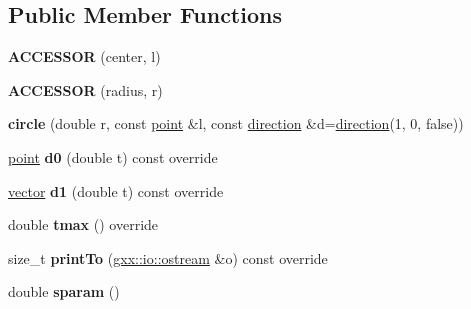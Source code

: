 \subsection*{Public Member Functions}
\begin{DoxyCompactItemize}
\item 
{\bfseries A\+C\+C\+E\+S\+S\+OR} (center, l)\hypertarget{classgxx_1_1geom2_1_1circle_a3fbb943fcea9df55e691b65dc692180a}{}\label{classgxx_1_1geom2_1_1circle_a3fbb943fcea9df55e691b65dc692180a}

\item 
{\bfseries A\+C\+C\+E\+S\+S\+OR} (radius, r)\hypertarget{classgxx_1_1geom2_1_1circle_abf1e43383d40e0531098a1a9c60620e7}{}\label{classgxx_1_1geom2_1_1circle_abf1e43383d40e0531098a1a9c60620e7}

\item 
{\bfseries circle} (double r, const \hyperlink{classmalgo_1_1vector2}{point} \&l, const \hyperlink{classmalgo_1_1unit__vector2}{direction} \&d=\hyperlink{classmalgo_1_1unit__vector2}{direction}(1, 0, false))\hypertarget{classgxx_1_1geom2_1_1circle_a8ecb3cd0d6a38d9554b9e3bae2ac3392}{}\label{classgxx_1_1geom2_1_1circle_a8ecb3cd0d6a38d9554b9e3bae2ac3392}

\item 
\hyperlink{classmalgo_1_1vector2}{point} {\bfseries d0} (double t) const override\hypertarget{classgxx_1_1geom2_1_1circle_af079d357aa91bb278f3fabf190caa665}{}\label{classgxx_1_1geom2_1_1circle_af079d357aa91bb278f3fabf190caa665}

\item 
\hyperlink{classmalgo_1_1vector2}{vector} {\bfseries d1} (double t) const override\hypertarget{classgxx_1_1geom2_1_1circle_ab4789d64c29578ce2e70a241fabfeee3}{}\label{classgxx_1_1geom2_1_1circle_ab4789d64c29578ce2e70a241fabfeee3}

\item 
double {\bfseries tmax} () override\hypertarget{classgxx_1_1geom2_1_1circle_a97cac06440f256ec67c680fbc973e9e6}{}\label{classgxx_1_1geom2_1_1circle_a97cac06440f256ec67c680fbc973e9e6}

\item 
size\+\_\+t {\bfseries print\+To} (\hyperlink{classgxx_1_1io_1_1ostream}{gxx\+::io\+::ostream} \&o) const override\hypertarget{classgxx_1_1geom2_1_1circle_ab1883e9a35d83218c36b32413c6fb4ac}{}\label{classgxx_1_1geom2_1_1circle_ab1883e9a35d83218c36b32413c6fb4ac}

\item 
double {\bfseries sparam} ()\hypertarget{classgxx_1_1geom2_1_1circle_a26e16cd9190f29df3dcfbbce020defc3}{}\label{classgxx_1_1geom2_1_1circle_a26e16cd9190f29df3dcfbbce020defc3}


\end{DoxyCompactItemize}
